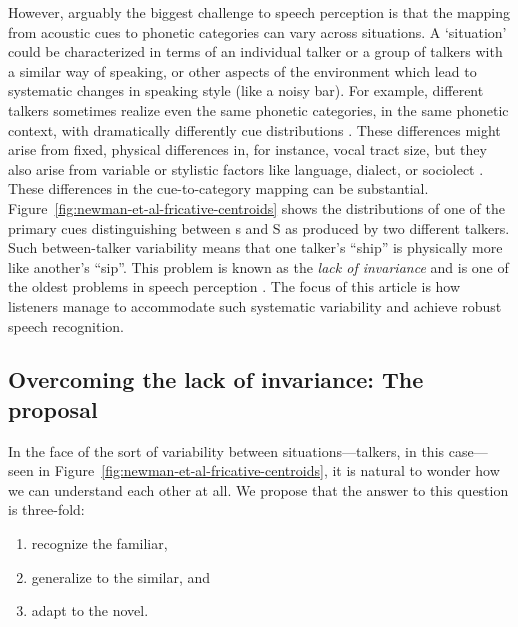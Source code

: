 \label{r3-environment-situation}
However, arguably the biggest challenge to speech perception is that the mapping from acoustic cues to phonetic categories can vary across situations. A `situation' could be characterized in terms of an individual talker or a group of talkers with a similar way of speaking, or other aspects of the environment which lead to systematic changes in speaking style (like a noisy bar). For example, different talkers sometimes realize even the same phonetic categories, in the same phonetic context, with dramatically differently cue distributions \autocite[e.g.,][]{Allen2003,McMurray2011a,Newman2001}.  These differences might arise from fixed, physical differences in, for instance, vocal tract size, but they also arise from variable or stylistic factors like language, dialect, or sociolect \autocite[e.g.,][]{Babel2014,Johnson2006,Labov1972,Pierrehumbert2003}.  These differences in the cue-to-category mapping can be substantial.
Figure~\ref{fig:newman-et-al-fricative-centroids} shows the distributions of one of the primary cues distinguishing between \ph s and \ph S as produced by two different talkers.  Such between-talker variability means that one talker's ``ship'' is physically more like another's ``sip''.
This problem is known as the \emph{lack of invariance} and is one of the oldest problems in speech perception \autocite{Liberman1967}.
The focus of this article is how listeners manage to accommodate such systematic variability and achieve robust speech recognition.

\subsection{Overcoming the lack of invariance: The proposal}
\label{sec:overc-lack-invar}

In the face of the sort of variability between situations---talkers, in this case---seen in Figure~\ref{fig:newman-et-al-fricative-centroids}, it is natural to wonder how we can understand each other at all.  We propose that the answer to this question is three-fold:

\begin{enumerate}
\item recognize the familiar,
\item generalize to the similar, and
\item adapt to the novel.
\end{enumerate}

